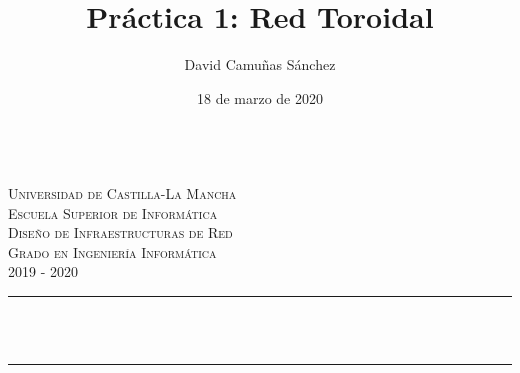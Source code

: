 \documentclass[11pt]{article}
\title{Práctica 1: Red Toroidal}							%
\author{David Camuñas Sánchez}							%
\date{18 de marzo de 2020}											%
\makeatletter
\newcommand{\subject}{Diseño de Infraestructuras de Red}						%
\newcommand{\course}{Grado en Ingeniería Informática}	%
\newcommand{\courseyear}{2019 - 2020} 					%
\let\thetitle\@title
\makeatother
\begin{document}

\begin{titlepage}
	\centering
	\begin{minipage}[t]{\textwidth}
		\hspace{\fill}
	\end{minipage}
	\\[2.25 cm]
    \textsc{\LARGE Universidad de Castilla-La Mancha}\\[1 cm]	%
    \textsc{\LARGE Escuela Superior de Informática}\\[2.0 cm]
	\textsc{\Large \subject}\\[0.5 cm]				%
	\textsc{\large \course \\ \courseyear}\\[2 cm]				%
	\rule{\linewidth}{0.2 mm} \\[0.4 cm]
	{ \huge \bfseries \thetitle}\\
	\rule{\linewidth}{0.2 mm} \\[2.5 cm]


\end{titlepage}
\end{document}
